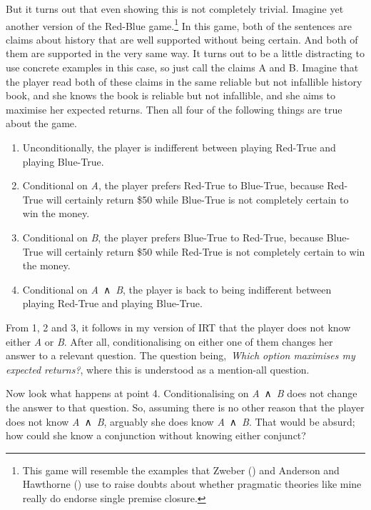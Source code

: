 \documentclass[
  10pt,
  letterpaper,
  twoside]{scrbook}
\providecommand{\tightlist}{%
  \setlength{\itemsep}{0pt}\setlength{\parskip}{0pt}}\usepackage{longtable,booktabs,array}
\begin{document}
But it turns out that even showing this is not completely trivial.
Imagine yet another version of the Red-Blue game.\footnote{This game
  will resemble the examples that Zweber
  () and Anderson and Hawthorne
  () use to raise doubts
  about whether pragmatic theories like mine really do endorse single
  premise closure.} In this game, both of the sentences are claims about
history that are well supported without being certain. And both of them
are supported in the very same way. It turns out to be a little
distracting to use concrete examples in this case, so just call the
claims A and B. Imagine that the player read both of these claims in the
same reliable but not infallible history book, and she knows the book is
reliable but not infallible, and she aims to maximise her expected
returns. Then all four of the following things are true about the game.

\begin{enumerate}
\def\labelenumi{\arabic{enumi}.}
\tightlist
\item
  Unconditionally, the player is indifferent between playing Red-True
  and playing Blue-True.
\item
  Conditional on \emph{A}, the player prefers Red-True to Blue-True,
  because Red-True will certainly return \$50 while Blue-True is not
  completely certain to win the money.
\item
  Conditional on \emph{B}, the player prefers Blue-True to Red-True,
  because Blue-True will certainly return \$50 while Red-True is not
  completely certain to win the money.
\item
  Conditional on \emph{A}~∧~\emph{B}, the player is back to being
  indifferent between playing Red-True and playing Blue-True.
\end{enumerate}

From 1, 2 and 3, it follows in my version of IRT that the player does
not know either \emph{A} or \emph{B}. After all, conditionalising on
either one of them changes her answer to a relevant question. The
question being,~\emph{Which option maximises my expected returns?},
where this is understood as a mention-all question.

Now look what happens at point 4. Conditionalising on
\emph{A}~∧~\emph{B} does not change the answer to that question. So,
assuming there is no other reason that the player does not know
\emph{A}~∧~\emph{B}, arguably she does know \emph{A}~∧~\emph{B}. That
would be absurd; how could she know a conjunction without knowing either
conjunct?
\end{document}
